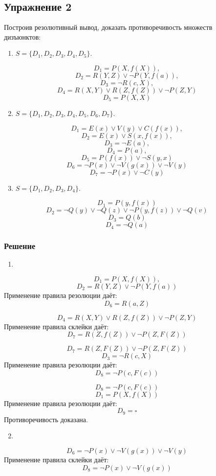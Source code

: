 \documentclass[11pt]{article}
\begin{document}
\subsection{Упражнение 2}
\label{sec:org70ab551}
Построив резолютивный вывод, доказать противоречивость множеств дизъюнктов:
\begin{enumerate}
\item \(S = \{D_1, D_2, D_3, D_4, D_5\}\).
\end{enumerate}
$$D_1 = P(X, f(X)),$$
$$D_2 = R(Y, Z) \lor \lnot P(Y, f(a)),$$
$$D_3 = \lnot R(c, X),$$
$$D_4 = R(X, Y) \lor R(Z, f(Z)) \lor \lnot P(Z, Y)$$
$$D_5 = P(X, X)$$
\begin{enumerate}
\setcounter{enumi}{1}
\item \(S = \{D_1, D_2, D_3, D_4, D_5, D_6, D_7\}\).
\end{enumerate}
$$D_1 = E(x) \lor V(y) \lor C(f(x)),$$
$$D_2 = E(x) \lor S(x, f(x)),$$
$$D_3 = \lnot E(a),$$
$$D_4 = P(a),$$
$$D_5 = P(f(x)) \lor \lnot S(y, x)$$
$$D_6 = \lnot P(x) \lor \lnot V(g(x)) \lor \lnot V(y)$$
$$D_7 = \lnot P(x) \lor \lnot C(y)$$
\begin{enumerate}
\setcounter{enumi}{2}
\item \(S = \{D_1, D_2, D_3, D_4\}\).
\end{enumerate}
$$D_1 = P(y, f(x))$$
$$D_2 = \lnot Q(y) \lor \lnot Q(z) \lor \lnot P(y, f(z)) \lor \lnot Q(v)$$
$$D_3 = Q(b)$$
$$D_4 = \lnot Q(a)$$
\subsubsection{Решение}
\label{sec:org8ba4f14}
\begin{enumerate}
\item 
\end{enumerate}
$$D_1 = P(X, f(X)),$$
$$D_2 = R(Y, Z) \lor \lnot P(Y, f(a))$$
Применение правила резолюции даёт:
$$D_6 = R(a, Z)$$

$$D_4 = R(X, Y) \lor R(Z, f(Z)) \lor \lnot P(Z, Y)$$
Применение правила склейки даёт:
$$D_7 = R(Z, f(Z)) \lor \lnot P(Z, F(Z))$$

$$D_7 = R(Z, F(Z)) \lor \lnot P(Z, F(Z))$$
$$D_3 = \lnot R(c, X)$$
Применение правила резолюции даёт:
$$D_8 = \lnot P(c, F(c))$$

$$D_8 = \lnot P(c, F(c))$$
$$D_1 = P(X, f(X))$$
Применение правила резолюции даёт:
$$D_9 = \square$$
Противоречивость доказана.
\begin{enumerate}
\setcounter{enumi}{1}
\item 
\end{enumerate}
$$D_6 = \lnot P(x) \lor \lnot V(g(x)) \lor \lnot V(y)$$
Применение правила склейки даёт:
$$D_8 = \lnot P(x) \lor \lnot V(g(x))$$
\end{document}

